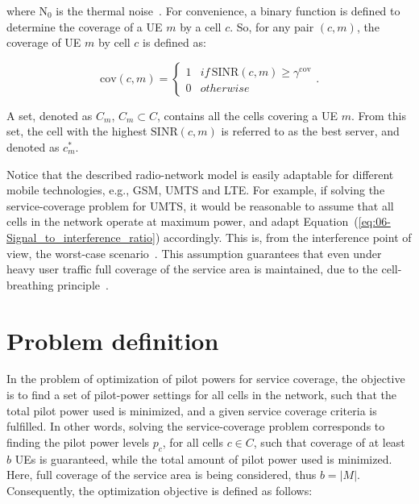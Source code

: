 \noindent where $\mathrm{N}_{0}$
is the thermal noise~\cite{RadioNetworkPlanningAndOptimisationForUMTS}.
For convenience, a binary function is defined to determine the coverage
of a UE $m$ by a cell $c$. So, for any pair $(c,m)$, the coverage
of UE $m$ by cell $c$ is defined as:

\begin{equation}
\mathrm{cov}(c,m)=\begin{cases}
1 & if\,\mathrm{SINR}(c,m)\ge\gamma^{\mathrm{cov}}\\
0 & otherwise
\end{cases}.
\end{equation}


\noindent {}

\noindent A set, denoted as $C_{m}$,
$C_{m}\subset C$, contains all the cells covering a UE $m$. From
this set, the cell with the highest $\mathrm{SINR}(c,m)$ is referred
to as the best server, and denoted as $c_{m}^{*}$.

\noindent Notice that the described radio-network model is easily
adaptable for different mobile technologies, e.g., GSM, UMTS and LTE.
For example, if solving the service-coverage problem for UMTS, it
would be reasonable to assume that all cells in the network operate
at maximum power, and adapt Equation~(\ref{eq:06-Signal_to_interference_ratio})
accordingly. This is, from the interference point of view, the worst-case
scenario~\cite{chen2008automated,Siomina:Minimum.pilot.power.for.service.coverage}.
This assumption guarantees that even under heavy user traffic full
coverage of the service area is maintained, due to the cell-breathing
principle~\cite{WCDMAforUMTS_RadioAccessForThirdGenerationMobileCommunications}.


\section{Problem definition}

In the problem of optimization of pilot powers for service coverage,
the objective is to find a set of pilot-power settings for all cells
in the network, such that the total pilot power used is minimized,
and a given service coverage criteria is fulfilled. In other words,
solving the service-coverage problem corresponds to finding the pilot
power levels $p_{c}$, for all cells $c\in C$, such that coverage
of at least $b$ UEs is guaranteed, while the total amount of pilot
power used is minimized. Here, full coverage of the service area is
being considered, thus $b=\vert M\vert$. Consequently, the optimization
objective is defined as follows:

